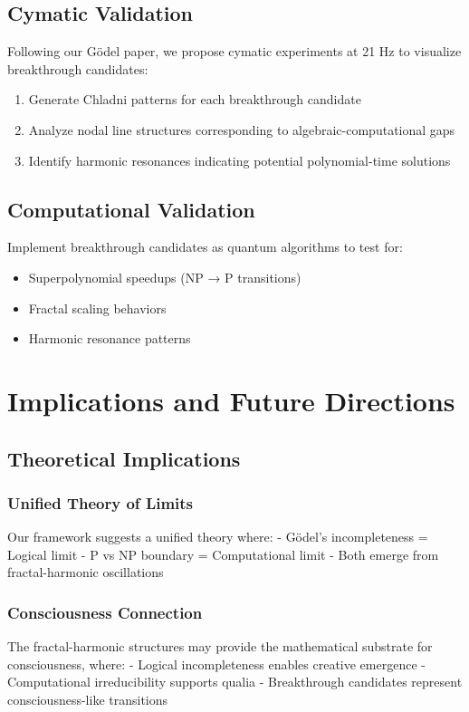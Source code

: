 \documentclass[12pt]{article}
\begin{document}
\subsection{Cymatic Validation}

Following our Gödel paper, we propose cymatic experiments at 21 Hz to visualize breakthrough candidates:

\begin{enumerate}
    \item Generate Chladni patterns for each breakthrough candidate
    \item Analyze nodal line structures corresponding to algebraic-computational gaps
    \item Identify harmonic resonances indicating potential polynomial-time solutions
\end{enumerate}

\subsection{Computational Validation}

Implement breakthrough candidates as quantum algorithms to test for:
\begin{itemize}
    \item Superpolynomial speedups (NP → P transitions)
    \item Fractal scaling behaviors
    \item Harmonic resonance patterns
\end{itemize}

\section{Implications and Future Directions}

\subsection{Theoretical Implications}

\subsubsection{Unified Theory of Limits}
Our framework suggests a unified theory where:
- Gödel's incompleteness = Logical limit
- P vs NP boundary = Computational limit
- Both emerge from fractal-harmonic oscillations

\subsubsection{Consciousness Connection}
The fractal-harmonic structures may provide the mathematical substrate for consciousness, where:
- Logical incompleteness enables creative emergence
- Computational irreducibility supports qualia
- Breakthrough candidates represent consciousness-like transitions
\end{document}
